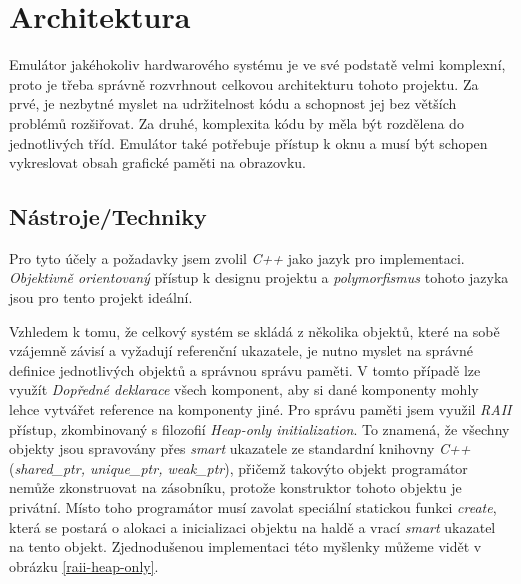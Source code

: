 \chapter{Architektura}

Emulátor jakéhokoliv hardwarového systému je ve své podstatě velmi komplexní, 
proto je třeba správně rozvrhnout celkovou architekturu tohoto projektu. 
Za prvé, je nezbytné myslet na udržitelnost kódu a schopnost jej bez větších problémů rozšiřovat. 
Za druhé, komplexita kódu by měla být rozdělena do jednotlivých tříd.
Emulátor také potřebuje přístup k oknu a musí být schopen vykreslovat obsah grafické paměti na obrazovku.

\section{Nástroje/Techniky}

Pro tyto účely a požadavky jsem zvolil \textit{C++} jako jazyk pro implementaci. 
\textit{Objektivně orientovaný} přístup k designu projektu a \textit{polymorfismus} tohoto jazyka jsou pro tento projekt ideální.

Vzhledem k tomu, že celkový systém se skládá z několika objektů, které na sobě vzájemně závisí a vyžadují
referenční ukazatele, je nutno myslet na správné definice jednotlivých objektů a správnou správu paměti.
V tomto případě lze využít \textit{Dopředné deklarace} všech komponent, aby si dané komponenty mohly lehce
vytvářet reference na komponenty jiné. Pro správu paměti jsem využil \textit{RAII} přístup, zkombinovaný s filozofií \textit{Heap-only initialization}.
To znamená, že všechny objekty jsou spravovány přes \textit{smart} ukazatele ze standardní knihovny \textit{C++} (\textit{shared\_ptr, unique\_ptr, weak\_ptr}),
přičemž takovýto objekt programátor nemůže zkonstruovat na zásobníku, protože konstruktor tohoto objektu je privátní. 
Místo toho programátor musí zavolat speciální statickou funkci \textit{create}, která se postará o alokaci a inicializaci objektu na haldě a
vrací \textit{smart} ukazatel na tento objekt. Zjednodušenou implementaci této myšlenky můžeme vidět v obrázku \ref{raii-heap-only}.

